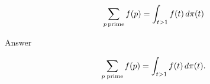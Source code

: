 $$
\sum_{p\, {\rm prime}} f(p)
=
\int_{t>1} f(t)\,d\pi(t)
$$

Answer

$$\sum_{p\rm\;prime}f(p)=\int_{t>1}f(t)\,d\pi(t).$$

\bye

